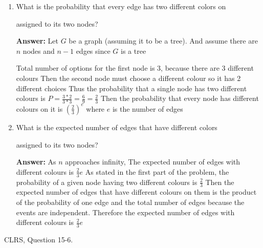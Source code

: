 \documentclass{article}
\begin{document}
\begin{enumerate}

   \item What is the probability that every edge has two different colors on

        assigned to its two nodes?

        

        \textbf{Answer:} Let $G$ be a graph (assuming it to be a tree). And assume there are $n$ nodes and $n-1$ edges since $G$ is a tree
        

        Total number of options for the first node is 3, because there are 3 different colours
 Then the second node must choose a different colour so it has 2 different choices
 Thus the probability that a single node has two different colours is $P = \frac{3*2}{3*3} = \frac{6}{9} = \frac{2}{3}$
 Then the probability that every node has different colours on it is $(\frac{2}{3})^e$ where $e$ is the number of edges
               

    \item What is the expected number of edges that have different colors

        assigned to its two nodes?

        

        \textbf{Answer:} As $n$ approaches infinity, The expected number of edges with different colours is $\frac{2}{3} e$
 As stated in the first part of the problem, the probability of a given node having two different colours is $\frac{2}{3}$
 Then the expected number of edges that have different colours on them is the product of the probability of one edge and the total number of edges
 because the events are independent. Therefore the expected number of edges with different colours is $\frac{2}{3} e$
        

\end{enumerate}



\nextprob

CLRS, Question 15-6.
\end{document}
